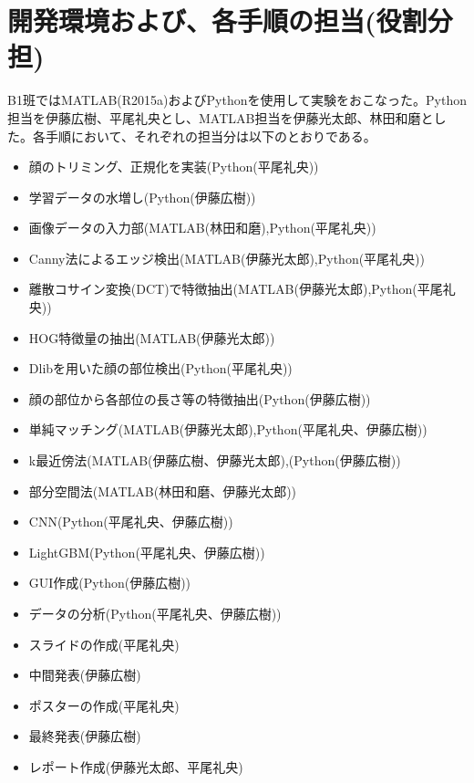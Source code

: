 \documentclass[10.5pt,a4j]{jarticle}
\begin{document}
	\section{開発環境および、各手順の担当(役割分担)}
	B1班ではMATLAB(R2015a)およびPythonを使用して実験をおこなった。Python担当を伊藤広樹、平尾礼央とし、MATLAB担当を伊藤光太郎、林田和磨とした。各手順において、それぞれの担当分は以下のとおりである。
	\begin{itemize}
		\item 顔のトリミング、正規化を実装(Python(平尾礼央))
		\item 学習データの水増し(Python(伊藤広樹))
		\item 画像データの入力部(MATLAB(林田和磨),Python(平尾礼央))
		\item Canny法によるエッジ検出(MATLAB(伊藤光太郎),Python(平尾礼央))
		\item 離散コサイン変換(DCT)で特徴抽出(MATLAB(伊藤光太郎),Python(平尾礼央))
		\item HOG特徴量の抽出(MATLAB(伊藤光太郎))
		\item Dlibを用いた顔の部位検出(Python(平尾礼央))
		\item 顔の部位から各部位の長さ等の特徴抽出(Python(伊藤広樹))
		\item 単純マッチング(MATLAB(伊藤光太郎),Python(平尾礼央、伊藤広樹))
		\item k最近傍法(MATLAB(伊藤広樹、伊藤光太郎),(Python(伊藤広樹))
		\item 部分空間法(MATLAB(林田和磨、伊藤光太郎))
		\item CNN(Python(平尾礼央、伊藤広樹))
		\item LightGBM(Python(平尾礼央、伊藤広樹))
		\item GUI作成(Python(伊藤広樹))
		\item データの分析(Python(平尾礼央、伊藤広樹))
		\item スライドの作成(平尾礼央)
		\item 中間発表(伊藤広樹)
		\item ポスターの作成(平尾礼央)
		\item 最終発表(伊藤広樹)
		\item レポート作成(伊藤光太郎、平尾礼央)
	\end{itemize}
\end{document}
